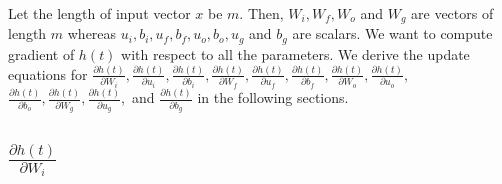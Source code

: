 \documentclass{article}
\begin{document}
Let the length of input vector $x$ be $m$. Then, $W_{i}, W_{f}, W_{o}$ and $W_{g}$ are vectors of length $m$ whereas $u_i, b_i, u_f, b_f, u_o, b_o, u_g$ and $b_g$ are scalars. We want to compute gradient of $h(t)$ with respect to all the parameters. We derive the update equations for $\frac{\partial h(t)}{\partial W_{i}} ,\frac{\partial h(t)}{\partial u_{i}}, $$\frac{\partial h(t)}{\partial b_{i}}, \frac{\partial h(t)}{\partial W_{f}} $$,\frac{\partial h(t)}{\partial u_{f}}, \frac{\partial h(t)}{\partial b_{f}}, $$\frac{\partial h(t)}{\partial W_{o}} ,\frac{\partial h(t)}{\partial u_{o}},$$ \frac{\partial h(t)}{\partial b_{o}}, \frac{\partial h(t)}{\partial W_{g}} ,\frac{\partial h(t)}{\partial u_{g}},$ and $\frac{\partial h(t)}{\partial b_{g}}$ in the following sections. 

\subsection{$\frac{\partial h(t)}{\partial W_{i}}$}
\end{document}
